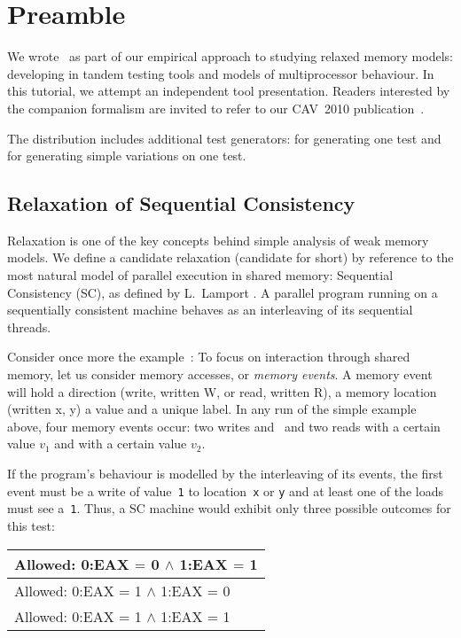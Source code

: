
\section{Preamble} \label{preamble}

We wrote~\diy{} as part of our empirical approach to studying relaxed memory
models: developing in tandem testing tools and models of multiprocessor
behaviour.  In this tutorial, we attempt an independent tool presentation.
Readers interested by the companion formalism are invited
to refer to our CAV~2010 publication~\cite{ams10}.

The distribution includes additional test generators:
 for generating one test
and 
for generating simple variations on one test.

\subsection{Relaxation of Sequential Consistency}

Relaxation is one of the key concepts behind simple analysis of weak memory
models.  We define a candidate relaxation (candidate for short) by reference to
the most natural model of
parallel execution in shared memory: Sequential Consistency (SC), as defined by
L.~Lamport \cite{lam79}. A parallel program running on a sequentially
consistent machine behaves as an interleaving of its sequential threads.

Consider once more the
example~:
 To focus on interaction through shared
memory, let us consider memory accesses, or \emph{memory events}.  A memory
event will hold a direction (write, written W, or read, written R), a memory
location (written x, y) a value and a unique label. In any run of the simple
example above, four memory events occur: two writes 
and~ and two reads  with a certain value $v_1$
and  with a certain value $v_2$.

If the program's
behaviour is modelled by the interleaving of its events, the first event must
be a write of value~\verb+1+ to location~\verb+x+ or \verb+y+ and at least one
of the loads must see a~\verb+1+. Thus, a SC machine would exhibit only three
possible outcomes for this test:

\begin{center}
\begin{tabular}{|l|}
\hline
Allowed: \mbox{0:EAX} $\mathord{=}$ \mbox{0} $\wedge$ \mbox{1:EAX} $\mathord{=}$ \mbox{1}\\\hline
Allowed: \mbox{0:EAX} $\mathord{=}$ \mbox{1} $\wedge$ \mbox{1:EAX} $\mathord{=}$ \mbox{0}\\\hline
Allowed: \mbox{0:EAX} $\mathord{=}$ \mbox{1} $\wedge$ \mbox{1:EAX} $\mathord{=}$ \mbox{1}\\\hline
\end{tabular}
\end{center}

